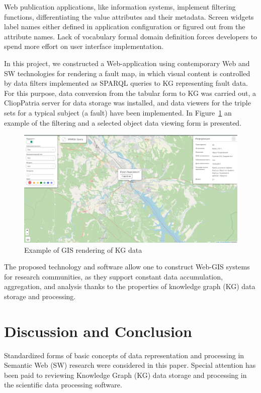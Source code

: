 \documentclass[
]{ceurart}
\begin{document}
Web publication applications, like information systems, implement filtering functions, differentiating the value attributes and their metadata.  Screen widgets label names either defined in application configuration or figured out from the attribute names.  Lack of vocabulary formal domain definition forces developers to spend more effort on user interface implementation.

In this project, we constructed a Web-application using contemporary Web and SW technologies for rendering a fault map, in which visual content is controlled by data filters implemented as SPARQL queries to KG representing fault data.  For this purpose, data conversion from the tabular form to KG was carried out, a CliopPatria server for data storage was installed, and data viewers for the triple sets for a typical subject (a fault) have been implemented.  In Figure~\ref{fig:gis-ex} an example of the filtering and a selected object data viewing form is presented.
\begin{figure}
  \centering
  \includegraphics[width=\linewidth]{faults-leaflet-doc.png}
  \caption{Example of GIS rendering of KG data}
  \label{fig:gis-ex}
\end{figure}

The proposed technology and software allow one to construct Web-GIS systems for research communities, as they support constant data accumulation, aggregation, and analysis thanks to the properties of knowledge graph (KG) data storage and processing.

\section{Discussion and Conclusion}
\label{sec:disc}

Standardized forms of basic concepts of data representation and processing in Semantic Web (SW) research were considered in this paper.  Special attention has been paid to reviewing Knowledge Graph (KG) data storage and processing in the scientific data processing software.
\end{document}
